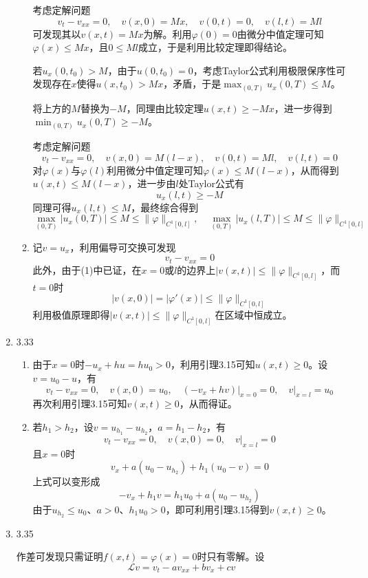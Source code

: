 \documentclass[a4paper,UTF8,fontset=windows,10pt]{ctexart}
\begin{document}
\begin{enumerate}
\begin{enumerate}[(1)]
        考虑定解问题
        $$v_t-v_{xx}=0,\quad v(x,0)=Mx,\quad v(0,t)=0,\quad v(l,t)=Ml$$
        可发现其以$v(x,t)=Mx$为解。利用$\varphi(0)=0$由微分中值定理可知$\varphi(x)\le Mx$，且$0\le Ml$成立，于是利用比较定理即得结论。
    
        若$u_x(0,t_0)>M$，由于$u(0,t_0)=0$，考虑Taylor公式利用极限保序性可发现存在$x$使得$u(x,t_0)>Mx$，矛盾，于是$\max_{(0,T)}u_x(0,T)\le M$。
    
        将上方的$M$替换为$-M$，同理由比较定理$u(x,t)\ge -Mx$，进一步得到$\min_{(0,T)}u_x(0,T)\ge-M$。
    
        考虑定解问题
        $$v_t-v_{xx}=0,\quad v(x,0)=M(l-x),\quad v(0,t)=Ml,\quad v(l,t)=0$$
        对$\varphi(x)$与$\varphi(l)$利用微分中值定理可知$\varphi(x)\le M(l-x)$，从而得到$u(x,t)\le M(l-x)$，进一步由$l$处Taylor公式有
        $$u_x(l,t)\ge-M$$
        同理可得$u_x(l,t)\le M$，最终综合得到
        $$\max_{(0,T)}|u_x(0,T)|\le M\le\|\varphi\|_{C^1[0,l]},\quad\max_{(0,T)}|u_x(l,T)|\le M\le\|\varphi\|_{C^1[0,l]}$$
    
        \item 记$v=u_x$，利用偏导可交换可发现
        $$v_t-v_{xx}=0$$
        此外，由于(1)中已证，在$x=0$或$l$的边界上$|v(x,t)|\le\|\varphi\|_{C^1[0,l]}$，而$t=0$时
        $$|v(x,0)|=|\varphi'(x)|\le\|\varphi\|_{C^1[0,l]}$$
        利用极值原理即得$|v(x,t)|\le\|\varphi\|_{C^1[0,l]}$在区域中恒成立。
    \end{enumerate}
    
    \item 3.33
    \begin{enumerate}[(1)]
        \item 由于$x=0$时$-u_x+hu=hu_0>0$，利用引理3.15可知$u(x,t)\ge0$。设$v=u_0-u$，有
        $$v_t-v_{xx}=0,\quad v(x,0)=u_0,\quad (-v_x+hv)\big|_{x=0}=0,\quad v\big|_{x=l}=u_0$$
        再次利用引理3.15可知$v(x,t)\ge0$，从而得证。
    
        \item 若$h_1>h_2$，设$v=u_{h_1}-u_{h_2}$，$a=h_1-h_2$，有
        $$v_t-v_{xx}=0,\quad v(x,0)=0,\quad v\big|_{x=l}=0$$
        且$x=0$时
        $$v_x+a(u_0-u_{h_2})+h_1(u_0-v)=0$$
        上式可以变形成
        $$-v_x+h_1v=h_1u_0+a(u_0-u_{h_2})$$
        由于$u_{h_2}\le u_0$、$a>0$、$h_1u_0>0$，即可利用引理3.15得到$v(x,t)\ge0$。
    \end{enumerate}
    
    \item 3.35
    
    作差可发现只需证明$f(x,t)=\varphi(x)=0$时只有零解。设
    $$\mathcal{L}v=v_t-av_{xx}+bv_x+cv$$
    

\end{enumerate}
\end{document}
